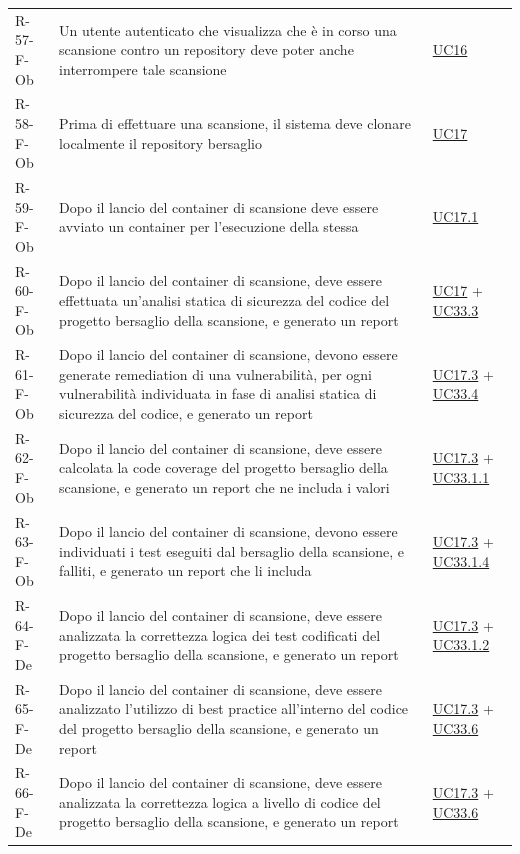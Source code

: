 \documentclass[a4paper, 11pt]{article}
\begin{document}
\begin{longtable}[c]{ >{\centering\arraybackslash}m{2.5cm} >{\centering\arraybackslash}m{8.3cm} >{\centering\arraybackslash}m{3.5cm} }
    R-57-F-Ob & Un utente autenticato che visualizza che è in corso una scansione contro un repository deve poter anche interrompere tale scansione & \hyperref[UC16]{UC16}\\
    R-58-F-Ob & Prima di effettuare una scansione, il sistema deve clonare localmente il repository bersaglio & \hyperref[UC17]{UC17}\\
    R-59-F-Ob & Dopo il lancio del container di scansione deve essere avviato un container per l'esecuzione della stessa & \hyperref[UC17.1]{UC17.1}\\
    R-60-F-Ob & Dopo il lancio del container di scansione, deve essere effettuata un'analisi statica di sicurezza del codice del progetto bersaglio della scansione, e generato un report & \hyperref[UC17]{UC17} + \hyperref[UC33.3]{UC33.3}\\
    R-61-F-Ob & Dopo il lancio del container di scansione, devono essere generate remediation di una vulnerabilità, per ogni vulnerabilità individuata in fase di analisi statica di sicurezza del codice, e generato un report & \hyperref[UC17.3]{UC17.3} + \hyperref[UC33.4]{UC33.4}\\
    R-62-F-Ob & Dopo il lancio del container di scansione, deve essere calcolata la code coverage del progetto bersaglio della scansione, e generato un report che ne includa i valori & \hyperref[UC17.3]{UC17.3} + \hyperref[UC33.1.1]{UC33.1.1}\\
    R-63-F-Ob & Dopo il lancio del container di scansione, devono essere individuati i test eseguiti dal bersaglio della scansione, e falliti, e generato un report che li includa & \hyperref[UC17.3]{UC17.3} + \hyperref[UC33.1.4]{UC33.1.4}\\
    R-64-F-De & Dopo il lancio del container di scansione, deve essere analizzata la correttezza logica dei test codificati del progetto bersaglio della scansione, e generato un report & \hyperref[UC17.3]{UC17.3} + \hyperref[UC33.1.2]{UC33.1.2}\\
    R-65-F-De & Dopo il lancio del container di scansione, deve essere analizzato l'utilizzo di best practice all'interno del codice del progetto bersaglio della scansione, e generato un report & \hyperref[UC17.3]{UC17.3} + \hyperref[UC33.6]{UC33.6}\\
    R-66-F-De & Dopo il lancio del container di scansione, deve essere analizzata la correttezza logica a livello di codice del progetto bersaglio della scansione, e generato un report & \hyperref[UC17.3]{UC17.3} + \hyperref[UC33.6]{UC33.6}\\

\end{longtable}
\end{document}

